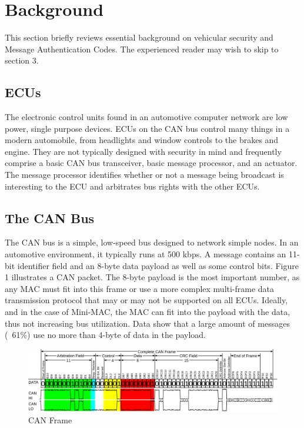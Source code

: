 \section{Background}

This section briefly reviews essential background on vehicular security and Message Authentication Codes. The experienced reader may wish to skip to section 3.

\subsection{ECUs}
The electronic control units found in an automotive computer network are low power, single purpose devices. ECUs on the CAN bus control many things in a modern automobile, from headlights and window controls to the brakes and engine. They are not typically designed with security in mind and frequently comprise a basic CAN bus transceiver, basic message processor, and an actuator. The message processor identifies whether or not a message being broadcast is interesting to the ECU and arbitrates bus rights with the other ECUs. %


\subsection{The CAN Bus}
The CAN bus is a simple, low-speed bus designed to network simple nodes. In an automotive environment, it typically runs at 500 kbps. A message contains an 11-bit identifier field and an 8-byte data payload as well as some control bits. Figure 1 illustrates a CAN packet. The 8-byte payload is the most important number, as any MAC must fit into this frame or use a more complex multi-frame data transmission protocol that may or may not be supported on all ECUs. Ideally, and in the case of Mini-MAC, the MAC can fit into the payload with the data, thus not increasing bus utilization. Data show that a large amount of messages (~61\%) use no more than 4-byte of data in the payload.

	\begin{figure}
		\centering
		\includegraphics[width=\columnwidth]{figures/can_frame.png}
		\caption{CAN Frame}
	\end{figure}

